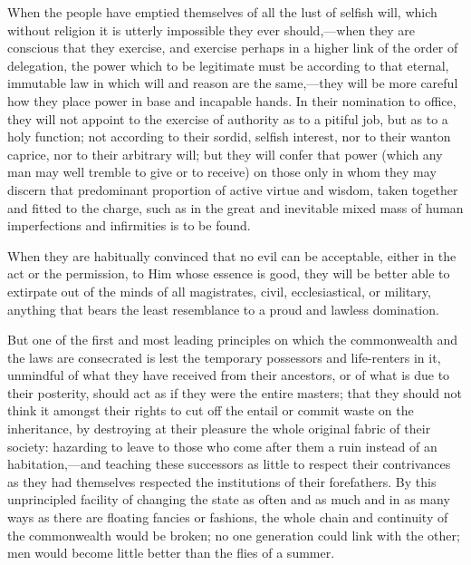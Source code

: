 When the people have emptied themselves of all the lust of selfish will, which without religion it is utterly impossible they ever should,—when they are conscious that they exercise, and exercise perhaps in a higher link of the order of delegation, the power which to be legitimate must be according to that eternal, immutable law in which will and reason are the same,—they will be more careful how they place power in base and incapable hands. In their nomination to office, they will not appoint to the exercise of authority as to a pitiful job, but as to a holy function; not according to their sordid, selfish interest, nor to their wanton caprice, nor to their arbitrary will; but they will confer that power (which any man may well tremble to give or to receive) on those only in whom they may discern that predominant proportion of active virtue and wisdom, taken together and fitted to the charge, such as in the great and inevitable mixed mass of human imperfections and infirmities is to be found.

When they are habitually convinced that no evil can be acceptable, either in the act or the permission, to Him whose essence is good, they will be better able to extirpate out of the minds of all magistrates, civil, ecclesiastical, or military, anything that bears the least resemblance to a proud and lawless domination.

But one of the first and most leading principles on which the commonwealth and the laws are consecrated is lest the temporary possessors and life-renters in it, unmindful of what they have received from their ancestors, or of what is due to their posterity, should act as if they were the entire masters; that they should not think it amongst their rights to cut off the entail or commit waste on the inheritance, by destroying at their pleasure the whole original fabric of their society: hazarding to leave to those who come after them a ruin instead of an habitation,—and teaching these successors as little to respect their contrivances as they had themselves respected the institutions of their forefathers. By this unprincipled facility of changing the state as often and as much and in as many ways as there are floating fancies or fashions, the whole chain and continuity of the commonwealth would be broken; no one generation could link with the other; men would become little better than the flies of a summer.

